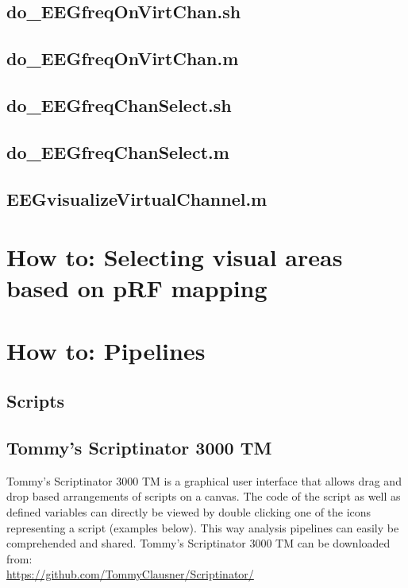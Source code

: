 \documentclass[12pt,a4paper]{scrartcl}
\begin{document}
\subsection{do\_EEGfreqOnVirtChan.sh}

\subsection{do\_EEGfreqOnVirtChan.m}

\subsection{do\_EEGfreqChanSelect.sh}
\label{sec:selchan}

\subsection{do\_EEGfreqChanSelect.m}

\subsection{EEGvisualizeVirtualChannel.m}

\section{How to: Selecting visual areas based on pRF mapping}
\label{sec:GUIprf}

\section{How to: Pipelines}
\label{sec:pipelines}
\subsection{Scripts}
\subsection{Tommy's Scriptinator 3000 TM}
\label{sec:scriptinator}
Tommy's Scriptinator 3000 TM is a graphical user interface that allows drag and drop based arrangements of scripts on a canvas. The code of the script as well as defined variables can directly be viewed by double clicking one of the icons representing a script (examples below). This way analysis pipelines can easily be comprehended and shared. Tommy's Scriptinator 3000 TM can be downloaded from:\\

\href{https://github.com/TommyClausner/Scriptinator/}{https://github.com/TommyClausner/Scriptinator/}\\
\end{document}
